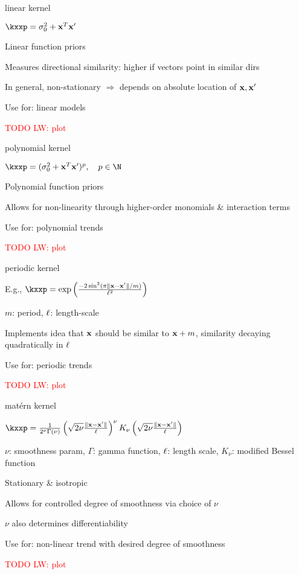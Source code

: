 \documentclass[11pt,compress,t,notes=noshow, xcolor=table]{beamer}
\begin{document}
\begin{framei}{linear kernel}
\item $\kxxp = \sigma^2_0 + \xv^T \xv^\prime$
\item Linear function priors
\item Measures directional similarity: higher if vectors point in similar dirs
\item In general, non-stationary $\Rightarrow$ depends on absolute location of $\mathbf{x}, \mathbf{x}^\prime$
\item Use for: linear models
\item \textcolor{red}{TODO LW: plot}
\end{framei}

\begin{framei}{polynomial kernel}
\item $\kxxp = (\sigma^2_0 + \xv^T \xv^\prime )^p, \quad p \in \N$
\item Polynomial function priors
\item Allows for non-linearity through higher-order monomials \& interaction terms
\item Use for: polynomial trends
\item \textcolor{red}{TODO LW: plot}
\end{framei}

\begin{framei}{periodic kernel}
\item E.g., $\kxxp = \exp \left(\frac{-2\sin^2 (\pi \| \xv - \xv^\prime\| / m)}{\ls^2} \right)$
\item $m$: period, $\ell$: length-scale
\item Implements idea that $\mathbf{x}$ should be similar to $\mathbf{x} + m$, similarity decaying quadratically in $\ell$
\item Use for: periodic trends
\item \textcolor{red}{TODO LW: plot}
\end{framei}

\begin{framei}{matérn kernel}
\item $\kxxp = \frac{1}{2^\nu \Gamma(\nu)} \left( \sqrt{2 \nu} \frac{\| \xv - \xv^\prime \|}{\ls} \right)^\nu K_\nu \left( \sqrt{2 \nu} \frac{\| \xv - \xv^\prime \|}{\ls} \right)$
\item $\nu$: smoothness param, $\Gamma$: gamma function, $\ell$: length scale, $K_\nu$: modified Bessel function
\item Stationary \& isotropic
\item Allows for controlled degree of smoothness via choice of $\nu$
\item $\nu$ also determines differentiability
\item Use for: non-linear trend with desired degree of smoothness
\item \textcolor{red}{TODO LW: plot}
\end{framei}
\end{document}
